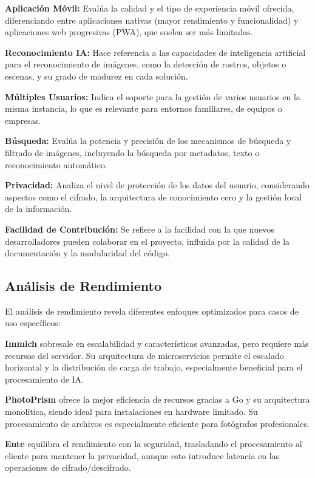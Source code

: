 \textbf{Aplicación Móvil:} Evalúa la calidad y el tipo de experiencia móvil ofrecida, diferenciando entre aplicaciones nativas (mayor rendimiento y funcionalidad) y aplicaciones web progresivas (PWA), que suelen ser más limitadas.

\textbf{Reconocimiento IA:} Hace referencia a las capacidades de inteligencia artificial para el reconocimiento de imágenes, como la detección de rostros, objetos o escenas, y su grado de madurez en cada solución.

\textbf{Múltiples Usuarios:} Indica el soporte para la gestión de varios usuarios en la misma instancia, lo que es relevante para entornos familiares, de equipos o empresas.

\textbf{Búsqueda:} Evalúa la potencia y precisión de los mecanismos de búsqueda y filtrado de imágenes, incluyendo la búsqueda por metadatos, texto o reconocimiento automático.

\textbf{Privacidad:} Analiza el nivel de protección de los datos del usuario, considerando aspectos como el cifrado, la arquitectura de conocimiento cero y la gestión local de la información.

\textbf{Facilidad de Contribución:} Se refiere a la facilidad con la que nuevos desarrolladores pueden colaborar en el proyecto, influida por la calidad de la documentación y la modularidad del código.

\subsection{Análisis de Rendimiento}

El análisis de rendimiento revela diferentes enfoques optimizados para casos de uso específicos:

\textbf{Immich} sobresale en escalabilidad y características avanzadas, pero requiere más recursos del servidor. Su arquitectura de microservicios permite el escalado horizontal y la distribución de carga de trabajo, especialmente beneficial para el procesamiento de IA.

\textbf{PhotoPrism} ofrece la mejor eficiencia de recursos gracias a Go y su arquitectura monolítica, siendo ideal para instalaciones en hardware limitado. Su procesamiento de archivos es especialmente eficiente para fotógrafos profesionales.

\textbf{Ente} equilibra el rendimiento con la seguridad, trasladando el procesamiento al cliente para mantener la privacidad, aunque esto introduce latencia en las operaciones de cifrado/descifrado.

